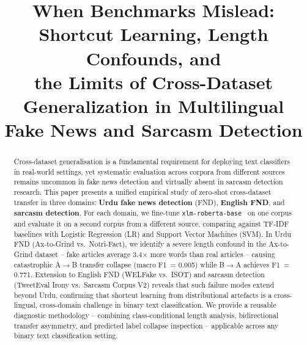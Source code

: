 \documentclass[conference]{IEEEtran}
\begin{document}
\title{When Benchmarks Mislead: Shortcut Learning, Length Confounds, and\\
the Limits of Cross-Dataset Generalization in Multilingual\\
Fake News and Sarcasm Detection}

\author{
}

\maketitle

\begin{abstract}
Cross-dataset generalisation is a fundamental requirement for deploying
text classifiers in real-world settings, yet systematic evaluation across
corpora from different sources remains uncommon in fake news detection
and virtually absent in sarcasm detection research. This paper presents
a unified empirical study of zero-shot cross-dataset transfer in three
domains: \textbf{Urdu fake news detection} (FND), \textbf{English FND},
and \textbf{sarcasm detection}. For each domain, we fine-tune
\texttt{xlm-roberta-base}~\cite{conneau2020unsupervised} on one corpus
and evaluate it on a second corpus from a different source, comparing
against TF-IDF baselines with Logistic Regression (LR) and Support
Vector Machines (SVM). In Urdu FND (Ax-to-Grind vs.\ Notri-Fact), we
identify a severe length confound in the Ax-to-Grind dataset
-- fake articles average 3.4$\times$ more words than real articles --
causing catastrophic A$\rightarrow$B transfer collapse (macro F1~=
0.005) while B$\rightarrow$A achieves F1~= 0.771. Extension to English
FND (WELFake vs.\ ISOT) and sarcasm detection (TweetEval Irony
vs.\ Sarcasm Corpus V2) reveals that such failure modes extend beyond
Urdu, confirming that shortcut learning from distributional artefacts
is a cross-lingual, cross-domain challenge in binary text classification.
We provide a reusable diagnostic methodology -- combining
class-conditional length analysis, bidirectional transfer asymmetry, and
predicted label collapse inspection -- applicable across any binary text
classification setting.
\end{abstract}
\end{document}
